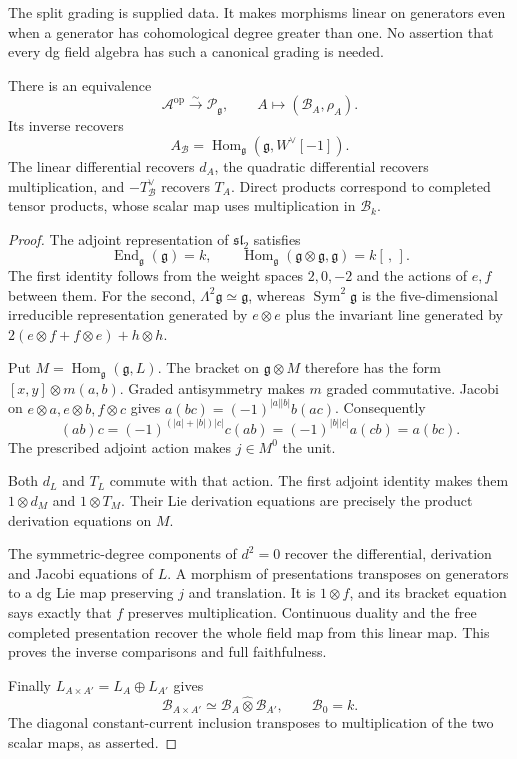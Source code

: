 The split grading is supplied data. It makes morphisms linear on
generators even when a generator has cohomological degree greater
than one. No assertion that every dg field algebra has such a
canonical grading is needed.

\begin{theorem}\label{cycmp:thm:current-recognition}
There is an equivalence
\[
 \mathcal A^{\mathrm{op}}\xrightarrow{\sim}\mathcal P_{\mathfrak g},
 \qquad A\longmapsto(\mathcal B_A,\rho_A).
\]
Its inverse recovers
\[
 A_{\mathcal B}=
 \operatorname{Hom}_{\mathfrak g}(\mathfrak g,W^\vee[-1]).
\]
The linear differential recovers $d_A$, the quadratic differential
recovers multiplication, and $-T_{\mathcal B}^\vee$ recovers $T_A$.
Direct products correspond to completed tensor products, whose
scalar map uses multiplication in $\mathcal B_k$.
\end{theorem}

\begin{proof}
The adjoint representation of $\mathfrak{sl}_2$ satisfies
\[
 \operatorname{End}_{\mathfrak g}(\mathfrak g)=k,
 \qquad
 \operatorname{Hom}_{\mathfrak g}(\mathfrak g\otimes\mathfrak g,
                                \mathfrak g)=k[\,,\,].
\]
The first identity follows from the weight spaces $2,0,-2$ and
the actions of $e,f$ between them. For the second,
$\Lambda^2\mathfrak g\simeq\mathfrak g$, whereas
$\operatorname{Sym}^2\mathfrak g$ is the five-dimensional
irreducible representation generated by $e\otimes e$ plus
the invariant line generated by
$2(e\otimes f+f\otimes e)+h\otimes h$.

Put $M=\operatorname{Hom}_{\mathfrak g}(\mathfrak g,L)$.
The bracket on $\mathfrak g\otimes M$ therefore has the form
$[x,y]\otimes m(a,b)$. Graded antisymmetry makes $m$ graded
commutative. Jacobi on $e\otimes a,e\otimes b,f\otimes c$ gives
$a(bc)=(-1)^{|a||b|}b(ac)$. Consequently
\[
 (ab)c=(-1)^{(|a|+|b|)|c|}c(ab)
      =(-1)^{|b||c|}a(cb)=a(bc).
\]
The prescribed adjoint action makes $j\in M^0$ the unit.

Both $d_L$ and $T_L$ commute with that action. The first adjoint
identity makes them $1\otimes d_M$ and $1\otimes T_M$.
Their Lie derivation equations are precisely the product
derivation equations on $M$.

The symmetric-degree components of $d^2=0$ recover the differential,
derivation and Jacobi equations of $L$. A morphism of presentations
transposes on generators to a dg Lie map preserving $j$ and
translation. It is $1\otimes f$, and its bracket equation says
exactly that $f$ preserves multiplication. Continuous duality and
the free completed presentation recover the whole field map from
this linear map. This proves the inverse comparisons and full
faithfulness.

Finally $L_{A\times A'}=L_A\oplus L_{A'}$ gives
\[
 \mathcal B_{A\times A'}\simeq
       \mathcal B_A\widehat\otimes\mathcal B_{A'},\qquad
 \mathcal B_0=k.
\]
The diagonal constant-current inclusion transposes to multiplication
of the two scalar maps, as asserted.
\end{proof}

